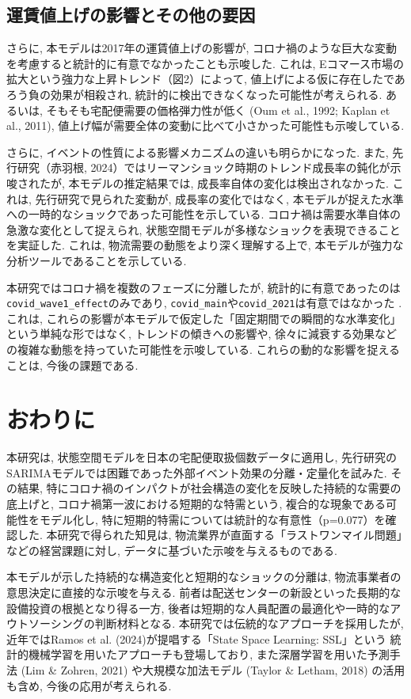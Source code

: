 \documentclass{bcsj}
\begin{document}
\subsection{運賃値上げの影響とその他の要因}
さらに, 本モデルは2017年の運賃値上げの影響が, コロナ禍のような巨大な変動を考慮すると統計的に有意でなかったことも示唆した. 
これは, Eコマース市場の拡大という強力な上昇トレンド（図2）によって, 
値上げによる仮に存在したであろう負の効果が相殺され, 統計的に検出できなくなった可能性が考えられる. 
あるいは, そもそも宅配便需要の価格弾力性が低く (Oum et al., 1992; Kaplan et al., 2011), 
値上げ幅が需要全体の変動に比べて小さかった可能性も示唆している.

さらに, イベントの性質による影響メカニズムの違いも明らかになった. 
また, 先行研究（赤羽根, 2024）ではリーマンショック時期のトレンド成長率の鈍化が示唆されたが, 
本モデルの推定結果では, 成長率自体の変化は検出されなかった. 
これは, 先行研究で見られた変動が, 成長率の変化ではなく, 本モデルが捉えた水準への一時的なショックであった可能性を示している. 
コロナ禍は需要水準自体の急激な変化として捉えられ, 状態空間モデルが多様なショックを表現できることを実証した. これは, 
物流需要の動態をより深く理解する上で, 本モデルが強力な分析ツールであることを示している. 

本研究ではコロナ禍を複数のフェーズに分離したが, 統計的に有意であったのは\texttt{covid\_wave1\_effect}のみであり, \texttt{covid\_main}や\texttt{covid\_2021}は有意ではなかった . 
これは, これらの影響が本モデルで仮定した「固定期間での瞬間的な水準変化」という単純な形ではなく, 
トレンドの傾きへの影響や, 徐々に減衰する効果などの複雑な動態を持っていた可能性を示唆している. 
これらの動的な影響を捉えることは, 今後の課題である. 

\section{おわりに}
本研究は, 状態空間モデルを日本の宅配便取扱個数データに適用し, 先行研究のSARIMAモデルでは困難であった外部イベント効果の分離・定量化を試みた. 
その結果, 特にコロナ禍のインパクトが社会構造の変化を反映した持続的な需要の底上げと, 
コロナ禍第一波における短期的な特需という, 複合的な現象である可能性をモデル化し, 特に短期的特需については統計的な有意性（p=0.077）を確認した. 
本研究で得られた知見は, 物流業界が直面する「ラストワンマイル問題」などの経営課題に対し, データに基づいた示唆を与えるものである. 

本モデルが示した持続的な構造変化と短期的なショックの分離は, 
物流事業者の意思決定に直接的な示唆を与える. 前者は配送センターの新設といった長期的な設備投資の根拠となり得る一方, 
後者は短期的な人員配置の最適化や一時的なアウトソーシングの判断材料となる. 
本研究では伝統的なアプローチを採用したが, 
近年ではRamos et al. (2024)が提唱する「State Space Learning: SSL」という
統計的機械学習を用いたアプローチも登場しており, また深層学習を用いた予測手法 (Lim \& Zohren, 2021) や大規模な加法モデル (Taylor \& Letham, 2018) の活用も含め, 
今後の応用が考えられる.  
\end{document}
